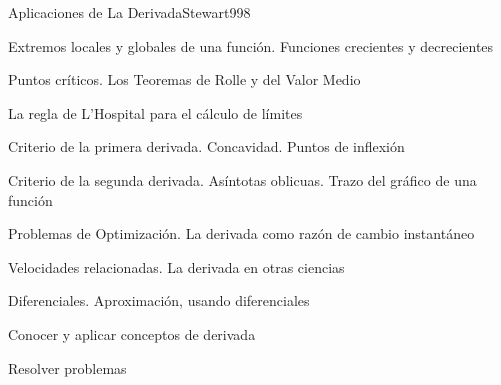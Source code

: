 \begin{sumilla}
\begin{unit}{Aplicaciones de La Derivada}{Stewart99}{8}
\begin{topicos}
	\item Extremos locales y globales de una funci\'on. Funciones crecientes y decrecientes
	\item Puntos cr\'iticos. Los Teoremas de Rolle y del Valor Medio
	\item La regla de L'Hospital para el c\'alculo de l\'imites
	\item Criterio de la primera derivada. Concavidad. Puntos de inflexi\'on
	\item Criterio de la segunda derivada. As\'intotas oblicuas. Trazo del gr\'afico de una funci\'on
	\item Problemas de Optimizaci\'on. La derivada como raz\'on de cambio instant\'aneo
	\item Velocidades relacionadas. La derivada en otras ciencias
	\item Diferenciales. Aproximaci\'on, usando diferenciales
\end{topicos}

\begin{objetivos}
	\item Conocer y aplicar conceptos de derivada
	\item Resolver problemas
\end{objetivos}
\end{unit}

\begin{bibliografia}
\end{bibliografia}
\end{sumilla}


